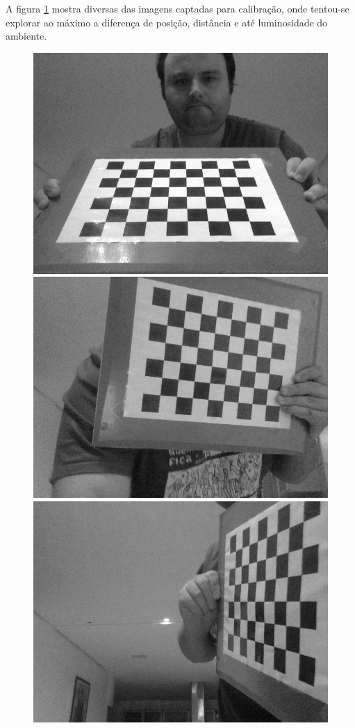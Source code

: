 \documentclass[conference]{IEEEtran}
\begin{document}
A figura \ref{snapshots} mostra diversas das imagens captadas para calibração, onde tentou-se explorar ao máximo a diferença de posição, distância e até luminosidade do ambiente.
\begin{figure}[!htb]\label{snapshots}
  \includegraphics[width=\linewidth]{snap-1.png}
\endminipage\hfill
{}
  \includegraphics[width=\linewidth]{snap-2.png}
\endminipage\hfill
{}%
  \includegraphics[width=\linewidth]{snap-3.png}

\end{figure}
\end{document}
